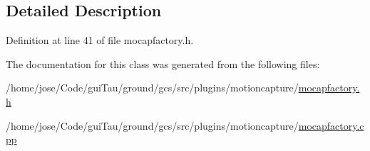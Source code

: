 \subsection{Detailed Description}


Definition at line 41 of file mocapfactory.\-h.



The documentation for this class was generated from the following files\-:\begin{DoxyCompactItemize}
\item 
/home/jose/\-Code/gui\-Tau/ground/gcs/src/plugins/motioncapture/\hyperlink{mocapfactory_8h}{mocapfactory.\-h}\item 
/home/jose/\-Code/gui\-Tau/ground/gcs/src/plugins/motioncapture/\hyperlink{mocapfactory_8cpp}{mocapfactory.\-cpp}\end{DoxyCompactItemize}
